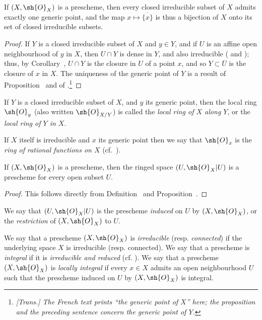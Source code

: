 \begin{proposition}[2.1.5]
\label{I.2.1.5}
If $(X,\sh{O}_X)$ is a prescheme, then every closed irreducible subset of $X$ admits exactly one generic point, and the map $x\mapsto\overline{\{x\}}$ is thus a bijection of $X$ onto its set of closed irreducible subsets.
\end{proposition}

\begin{proof}
If $Y$ is a closed irreducible subset of $X$ and $y\in Y$, and if $U$ is an affine open neighbourhood of $y$ in $X$, then $U\cap Y$ is dense in $Y$, and also irreducible ( and );
thus, by Corollary~, $U\cap Y$ is the closure in $U$ of a point $x$, and so $Y\subset\overline{U}$ is the closure of $x$ in $X$.
The uniqueness of the generic point of $Y$ is a result of Proposition~ and of .\footnote{\emph{[Trans.] The French text prints ``the generic point of $X$'' here; the proposition and the preceding sentence concern the generic point of $Y$.}}
\end{proof}

\begin{env}[2.1.6]
\label{I.2.1.6}
If $Y$ is a closed irreducible subset of $X$, and $y$ its generic point, then the local ring $\sh{O}_y$ (also written $\sh{O}_{X/Y}$) is called the \emph{local ring of $X$ along $Y$}, or the \emph{local ring of $Y$ in $X$}.

If $X$ itself is irreducible and $x$ its generic point then we say that $\sh{O}_x$ is the \emph{ring of rational functions on $X$} (cf.~).
\end{env}

\begin{proposition}[2.1.7]
\label{I.2.1.7}
If $(X,\sh{O}_X)$ is a prescheme, then the ringed space $(U,\sh{O}_X|U)$ is a prescheme for every open subset $U$.
\end{proposition}

\begin{proof}
This follows directly from Definition~ and Proposition~.
\end{proof}

We say that $(U,\sh{O}_X|U)$ is the prescheme \emph{induced} on $U$ by $(X,\sh{O}_X)$, or the \emph{restriction} of $(X,\sh{O}_X)$ to $U$.

\begin{env}[2.1.8]
\label{I.2.1.8}
We say that a prescheme $(X,\sh{O}_X)$ is \emph{irreducible} (resp. \emph{connected}) if the underlying space $X$ is irreducible (resp. connected).
We say that a prescheme is \emph{integral} if it is \emph{irreducible and reduced} (cf. ).
We say that a prescheme $(X,\sh{O}_X)$ is \emph{locally integral} if every $x\in X$ admits an open neighbourhood $U$ such that the prescheme induced on $U$ by $(X,\sh{O}_X)$ is integral.
\end{env}

